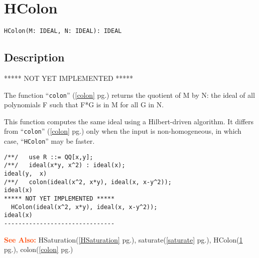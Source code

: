 \documentclass[a4paper]{mybook}
\newenvironment{command}{}{} %
\newcommand\SeeAlso{\par\textcolor{OrangeRed}{\textbf{\large See Also: }}}
\begin{document}
\section{HColon}
\label{HColon}
\begin{command} %


\begin{Verbatim}[label=syntax, rulecolor=\color{MidnightBlue},
frame=single]
HColon(M: IDEAL, N: IDEAL): IDEAL
\end{Verbatim}


\subsection*{Description}

***** NOT YET IMPLEMENTED *****
\par 
The function ``\verb&colon&'' (\ref{colon} pg.\pageref{colon}) returns the quotient of M by N:
the ideal of all polynomials F such that F*G is in M for all G in N.
\par 
This function computes the same ideal using a Hilbert-driven
algorithm. It differs from ``\verb&colon&'' (\ref{colon} pg.\pageref{colon}) only when the input
is non-homogeneous, in which case, ``\verb&HColon&'' may be faster.
\begin{Verbatim}[label=example, rulecolor=\color{PineGreen}, frame=single]
/**/   use R ::= QQ[x,y];
/**/   ideal(x*y, x^2) : ideal(x);
ideal(y,  x)
/**/   colon(ideal(x^2, x*y), ideal(x, x-y^2));
ideal(x)
***** NOT YET IMPLEMENTED *****
  HColon(ideal(x^2, x*y), ideal(x, x-y^2));
ideal(x)
-------------------------------
\end{Verbatim}


\SeeAlso %
  HSaturation(\ref{HSaturation} pg.\pageref{HSaturation}), 
    saturate(\ref{saturate} pg.\pageref{saturate}), 
    HColon(\ref{HColon} pg.\pageref{HColon}), 
    colon(\ref{colon} pg.\pageref{colon})
\end{command} %
\end{document}
